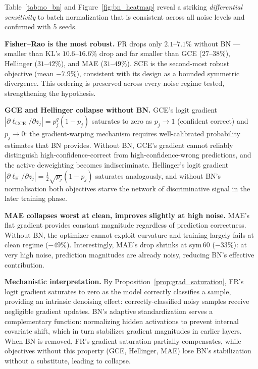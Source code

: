 \documentclass[11pt]{article}
\begin{document}
Table~\ref{tab:no_bn} and Figure~\ref{fig:bn_heatmap} reveal a striking \emph{differential
sensitivity} to batch normalization that is consistent across all noise levels and
confirmed with 5 seeds.

\textbf{Fisher--Rao is the most robust.} FR drops only $2.1$--$7.1\%$ without BN —
smaller than KL's $10.6$--$16.6\%$ drop and far smaller than GCE ($27$--$38\%$),
Hellinger ($31$--$42\%$), and MAE ($31$--$49\%$).
SCE is the second-most robust objective (mean $-7.9\%$), consistent with its design as a
bounded symmetric divergence.
This ordering is preserved across every noise regime tested, strengthening the hypothesis.

\textbf{GCE and Hellinger collapse without BN.}
GCE's logit gradient $|\partial\ell_\mathrm{GCE}/\partial z_j| = p_j^q(1-p_j)$
saturates to zero as $p_j \to 1$ (confident correct) and $p_j \to 0$: the
gradient-warping mechanism requires well-calibrated probability estimates that BN
provides.
Without BN, GCE's gradient cannot reliably distinguish high-confidence-correct from
high-confidence-wrong predictions, and the active deweighting becomes indiscriminate.
Hellinger's logit gradient $|\partial\ell_\mathrm{H}/\partial z_j| = \frac{1}{2}\sqrt{p_j}(1-p_j)$
saturates analogously, and without BN's normalisation both objectives starve the
network of discriminative signal in the later training phase.

\textbf{MAE collapses worst at clean, improves slightly at high noise.}
MAE's flat gradient provides constant magnitude regardless of prediction correctness.
Without BN, the optimizer cannot exploit curvature and training largely fails at clean
regime ($-49\%$). Interestingly, MAE's drop shrinks at sym\,60 ($-33\%$): at very high
noise, prediction magnitudes are already noisy, reducing BN's effective contribution.

\textbf{Mechanistic interpretation.} By Proposition~\ref{prop:grad_saturation},
FR's logit gradient saturates to zero as the model correctly classifies a sample,
providing an intrinsic denoising effect: correctly-classified noisy samples receive
negligible gradient updates.
BN's adaptive standardization serves a complementary function: normalizing hidden
activations to prevent internal covariate shift, which in turn stabilizes gradient
magnitudes in earlier layers.
When BN is removed, FR's gradient saturation partially compensates, while objectives
without this property (GCE, Hellinger, MAE) lose BN's stabilization without a substitute,
leading to collapse.
\end{document}
